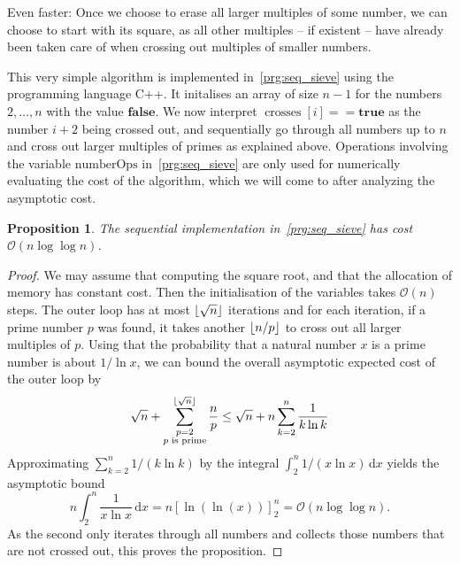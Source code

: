 \documentclass[a4paper,12pt]{article}
\newtheorem{proposition}{Proposition}
\DeclarePairedDelimiter\floor{\lfloor}{\rfloor}
\newcommand{\bigO}{\mathcal{O}}
\DeclareMathOperator{\crosses}{crosses}
\begin{document}
Even faster: Once we choose to erase all larger multiples of some number, we can choose to start with its square, as all other multiples -- if existent -- have already been taken care of when crossing out multiples of smaller numbers.

This very simple algorithm is implemented in~\autoref{prg:seq_sieve} using the programming language C++.
It initalises an array of size $n-1$ for the numbers $2,\dots, n$ with the value $\mathbf{false}$.
We now interpret $\crosses[i] == \mathbf{true}$ as the number $i+2$ being crossed out, and sequentially go through all numbers up to $n$ and cross out larger multiples of primes as explained above.
Operations involving the variable $\mathrm{numberOps}$ in~\autoref{prg:seq_sieve} are only used for numerically evaluating the cost of the algorithm, which we will come to after analyzing the asymptotic cost.

\begin{proposition}\label{prop:seq_sieve}
	The sequential implementation in~\autoref{prg:seq_sieve} has cost $\bigO(n \log \log n)$.
\end{proposition}
\begin{proof}
	We may assume that computing the square root, and that the allocation of memory has constant cost.
	Then the initialisation of the variables takes $\bigO(n)$ steps.
	The outer loop has at most $\floor{\sqrt{n}}$ iterations and for each iteration, if a prime number $p$ was found, it takes another $\floor{n / p}$ to cross out all larger multiples of $p$.
	Using that the probability that a natural number $x$ is a prime number is about $1/\ln x$, we can bound the overall asymptotic expected cost of the outer loop by
	\[
		\sqrt n + \sum_{\substack{p = 2 \\ \text{$p$ is prime}}}^{\floor{\sqrt{n}}} \frac{n}{p} \leq \sqrt{n} + n \sum_{k = 2}^n \frac{1}{k \ln k}
	\]
	Approximating $\sum_{k=2}^n 1/(k\ln k)$ by the integral $\int_2^n 1 / (x \ln x) \,\mathrm{d}x$ yields the asymptotic bound
	\[
		n \int_2^n \frac{1}{x \ln x}\, \mathrm{d}x = n \left[ \ln(\ln(x)) \right]_2^n = \bigO(n\log\log n ).
	\]
	As the second only iterates through all numbers and collects those numbers that are not crossed out, this proves the proposition.
\end{proof}
\end{document}
